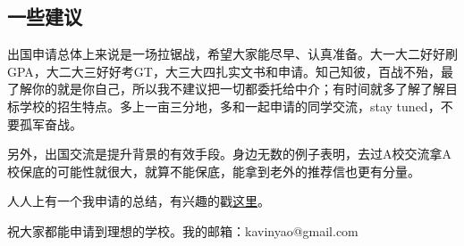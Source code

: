 \subsection{一些建议}

出国申请总体上来说是一场拉锯战，希望大家能尽早、认真准备。大一大二好好刷GPA，大二大三好好考GT，大三大四扎实文书和申请。知己知彼，百战不殆，最了解你的就是你自己，所以我不建议把一切都委托给中介；有时间就多了解了解目标学校的招生特点。多上一亩三分地，多和一起申请的同学交流，stay tuned，不要孤军奋战。\par

另外，出国交流是提升背景的有效手段。身边无数的例子表明，去过A校交流拿A校保底的可能性就很大，就算不能保底，能拿到老外的推荐信也更有分量。\par

人人上有一个我申请的总结，有兴趣的戳\href{http://blog.renren.com/blog/282030513/900352093}{这里}。

祝大家都能申请到理想的学校。我的邮箱：kavinyao@gmail.com